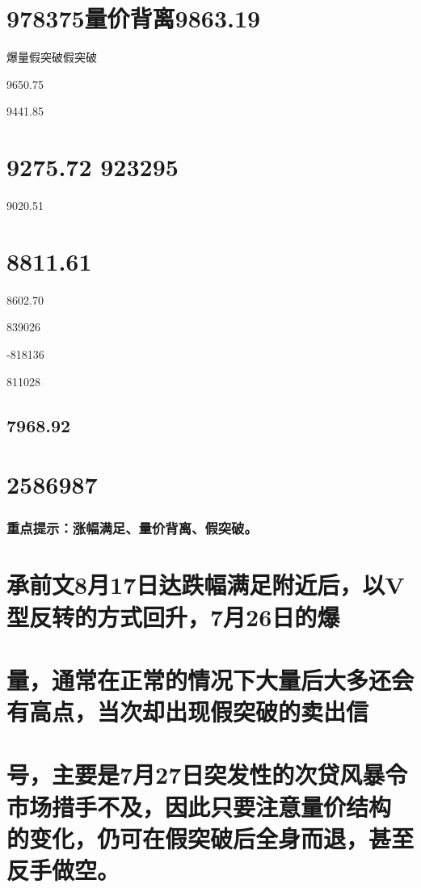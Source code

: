 \documentclass{article}
\begin{document}
\section{978375量价背离9863.19}

爆量假突破假突破

9650.75

9441.85

\section{9275.72 923295}

9020.51

\section{8811.61}

8602.70

839026

-818136

811028

\subsection{7968.92}

\section{2586987}

\subsubsection{重点提示：涨幅满足、量价背离、假突破。}

\section{承前文8月17日达跌幅满足附近后，以V型反转的方式回升，7月26日的爆}

\section{量，通常在正常的情况下大量后大多还会有高点，当次却出现假突破的卖出信}

\section{号，主要是7月27日突发性的次贷风暴令市场措手不及，因此只要注意量价结构 的变化，仍可在假突破后全身而退，甚至反手做空。}
\end{document}
